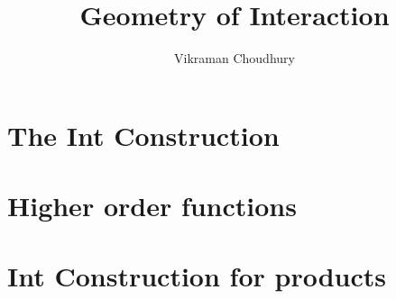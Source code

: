 \documentclass{article}
\title{Geometry of Interaction}
\author{Vikraman Choudhury}
\begin{document}
\maketitle

\section{The Int Construction}



\renewcommand{\AgdaIndent}[1]{\foreach \n in {1,...,#1}{\hspace{0.45em}}}


\section{Higher order functions}

\renewcommand{\AgdaIndent}[1]{\foreach \n in {1,...,#1}{\hspace{0.275em}}}


\section{Int Construction for products}

\renewcommand{\AgdaIndent}[1]{\foreach \n in {1,...,#1}{\hspace{0.14em}}}

\end{document}
